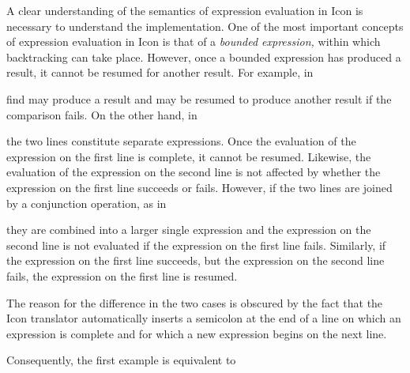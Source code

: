 A clear understanding of the semantics of expression evaluation in
Icon is necessary to understand the implementation.  One of the most
important concepts of expression evaluation in Icon is that of a
\textit{bounded expression, }within which backtracking can take
place. However, once a bounded expression has produced a result, it
cannot be resumed for another result. For example, in


\noindent find may produce a result and may be resumed to produce
another result if the comparison fails. On the other hand, in

\goodbreak
{}

\noindent the two lines constitute separate expressions. Once the
evaluation of the expression on the first line is complete, it cannot
be resumed. Likewise, the evaluation of the expression on the second
line is not affected by whether the expression on the first line
succeeds or fails. However, if the two lines are joined by a
conjunction operation, as in

\goodbreak
{}

\noindent they are combined into a larger single expression and the
expression on the second line is not evaluated if the expression on
the first line fails. Similarly, if the expression on the first line
succeeds, but the expression on the second line fails, the expression
on the first line is resumed.

The reason for the difference in the two cases is obscured by the fact
that the Icon translator automatically inserts a semicolon at the end
of a line on which an expression is complete and for which a new
expression begins on the next line.

Consequently, the first example is equivalent to

\goodbreak
{}

